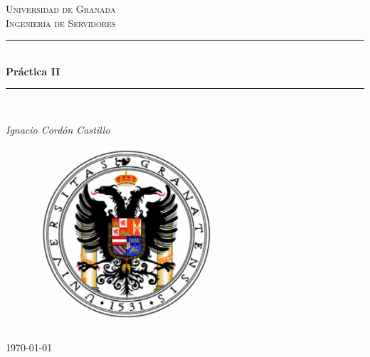 \documentclass[a4paper,11pt]{article}
\begin{document}
\begin{titlepage}

\newcommand{\HRule}{\rule{\linewidth}{0.5mm}} %

\center %
 
\textsc{\LARGE Universidad de Granada}\\[1.5cm]
\textsc{\Large Ingeniería de Servidores}\\[0.5cm] 

\bigskip
\HRule \\[0.4cm]
{ \huge \bfseries Práctica II}\\[0.4cm] %
\HRule \\[1.5cm]
 

\begin{minipage}{0.4\textwidth}
\begin{center} \large
\emph{Ignacio Cordón Castillo}\\
\end{center}
\end{minipage}


\begin{center}
\includegraphics[width=9cm]{../images/ugr.jpg}
\end{center}

\vspace{\fill}%
\large\today
\end{titlepage}  
\end{document}
